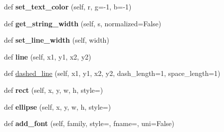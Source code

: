 \begin{DoxyCompactItemize}
\item 
def {\bfseries set\+\_\+text\+\_\+color} (self, r, g=-\/1, b=-\/1)\hypertarget{class_libraries_1_1fpdf_1_1fpdf_1_1_f_p_d_f_a0929f3a7a8d4acbfb0e519997fd06270}{}\label{class_libraries_1_1fpdf_1_1fpdf_1_1_f_p_d_f_a0929f3a7a8d4acbfb0e519997fd06270}

\item 
def {\bfseries get\+\_\+string\+\_\+width} (self, s, normalized=False)\hypertarget{class_libraries_1_1fpdf_1_1fpdf_1_1_f_p_d_f_a6ea0dcfb4f33d1c7343449031d79f7db}{}\label{class_libraries_1_1fpdf_1_1fpdf_1_1_f_p_d_f_a6ea0dcfb4f33d1c7343449031d79f7db}

\item 
def {\bfseries set\+\_\+line\+\_\+width} (self, width)\hypertarget{class_libraries_1_1fpdf_1_1fpdf_1_1_f_p_d_f_ab279cc58e94310684d806655f0cfcd41}{}\label{class_libraries_1_1fpdf_1_1fpdf_1_1_f_p_d_f_ab279cc58e94310684d806655f0cfcd41}

\item 
def {\bfseries line} (self, x1, y1, x2, y2)\hypertarget{class_libraries_1_1fpdf_1_1fpdf_1_1_f_p_d_f_a28afa7ae7377c096fe70427a3078b76e}{}\label{class_libraries_1_1fpdf_1_1fpdf_1_1_f_p_d_f_a28afa7ae7377c096fe70427a3078b76e}

\item 
def \hyperlink{class_libraries_1_1fpdf_1_1fpdf_1_1_f_p_d_f_a15e1f317fce8f0317bfe174f0685ec9d}{dashed\+\_\+line} (self, x1, y1, x2, y2, dash\+\_\+length=1, space\+\_\+length=1)
\item 
def {\bfseries rect} (self, x, y, w, h, style=\textquotesingle{}\textquotesingle{})\hypertarget{class_libraries_1_1fpdf_1_1fpdf_1_1_f_p_d_f_acc589ebed9e3f5affb84b9899a507f99}{}\label{class_libraries_1_1fpdf_1_1fpdf_1_1_f_p_d_f_acc589ebed9e3f5affb84b9899a507f99}

\item 
def {\bfseries ellipse} (self, x, y, w, h, style=\textquotesingle{}\textquotesingle{})\hypertarget{class_libraries_1_1fpdf_1_1fpdf_1_1_f_p_d_f_a4250cacaeafd3506591a7f9a832f335e}{}\label{class_libraries_1_1fpdf_1_1fpdf_1_1_f_p_d_f_a4250cacaeafd3506591a7f9a832f335e}

\item 
def {\bfseries add\+\_\+font} (self, family, style=\textquotesingle{}\textquotesingle{}, fname=\textquotesingle{}\textquotesingle{}, uni=False)\hypertarget{class_libraries_1_1fpdf_1_1fpdf_1_1_f_p_d_f_a7550fc067f0c0a57f26f797de6157010}{}\label{class_libraries_1_1fpdf_1_1fpdf_1_1_f_p_d_f_a7550fc067f0c0a57f26f797de6157010}


\end{DoxyCompactItemize}
